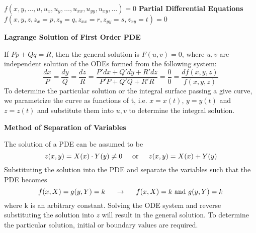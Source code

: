 \documentclass{article}
\begin{document}
\thispagestyle{empty}

\begin{tcolorbox}[colframe=SkyBlue, colback=SkyBlue!20]
	\begin{center} \begin{huge}
			$f(x,y, \dots, u, u_x, u_y, \dots, u_{xx}, u_{yy}, u_{xy}, \dots) = 0$ \hspace{2cm}
			\textbf{Partial Differential Equations} \hspace{2cm}
			$f(x,y,z,z_x=p,z_y=q,z_{xx}=r,z_{yy}=s,z_{xy}=t) = 0$
		\end{huge} \end{center}
\end{tcolorbox}
	
\begin{tcbraster}[raster equal height,raster valign=top,raster columns=2, raster rows=1]
	\begin{tcolorbox}[colframe=SkyBlue, colback=SkyBlue!15, height=9cm, width = 25cm,title=\begin{center} \begin{Large} \textbf{Solutions of PDEs} \end{Large} \end{center}]
		
		\begin{center} \textbf{Lagrange Solution of First Order PDE} \end{center}
		If $Pp + Qq = R$, then the general solution is $F(u,v) = 0$, where $u,v$ are independent solution of the ODEs formed from the following system:
		$$\frac{dx}{P} = \frac{dy}{Q} = \frac{dz}{R} = \frac{P'dx+Q'dy+R'dz}{P'P+Q'Q+R'R} = \frac{0}{0} = \frac{df(x,y,z)}{f(x,y,z)}$$
		To determine the particular solution or the integral surface passing a give curve, we parametrize the curve as functions of t, i.e. $x=x(t)$, $y=y(t)$ and $z=z(t)$ and substitute them into $u,v$ to determine the integral solution.
		
		\tcblower
		
		\begin{center} \textbf{Method of Separation of Variables} \end{center}
		The solution of a PDE can be assumed to  be
		$$z(x,y) = X(x) \cdot Y(y)\not = 0 \hspace{0.5cm} \text{or} \hspace{0.5cm} z(x,y) = X(x) + Y(y)$$
		Substituting the solution into the PDE and separate the variables such that the PDE becomes
		$$f(x,X) =g(y,Y) = k \hspace{0.5cm} \rightarrow \hspace{0.5cm} f(x,X) = k  \text{ and } g(y,Y) = k$$
		where k is an arbitrary constant. Solving the ODE system and reverse substituting the solution into $z$ will result in the general solution. To determine the particular solution, initial or boundary values are required. 
		

\end{tcolorbox}
\end{tcbraster}
\end{document}
